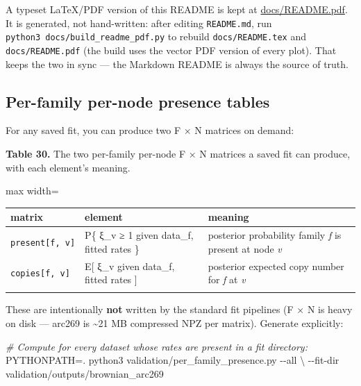 \documentclass[
  10pt,
]{article}
\newenvironment{Shaded}{}{}
\newcommand{\AttributeTok}[1]{\textcolor[rgb]{0.49,0.56,0.16}{#1}}
\newcommand{\CommentTok}[1]{\textcolor[rgb]{0.38,0.63,0.69}{\textit{#1}}}
\newcommand{\DataTypeTok}[1]{\textcolor[rgb]{0.56,0.13,0.00}{#1}}
\newcommand{\ExtensionTok}[1]{#1}
\newcommand{\NormalTok}[1]{#1}
\newcommand{\OperatorTok}[1]{\textcolor[rgb]{0.40,0.40,0.40}{#1}}
\newcommand{\VariableTok}[1]{\textcolor[rgb]{0.10,0.09,0.49}{#1}}
\begin{document}
A typeset LaTeX/PDF version of this README is kept at
\url{docs/README.pdf}. It is generated, not hand-written: after editing
\texttt{README.md}, run \texttt{python3\ docs/build\_readme\_pdf.py} to
rebuild \texttt{docs/README.tex} and \texttt{docs/README.pdf} (the build
uses the vector PDF version of every plot). That keeps the two in sync
--- the Markdown README is always the source of truth.

\subsection{Per-family per-node presence
tables}\label{per-family-per-node-presence-tables}

For any saved fit, you can produce two F × N matrices on demand:

\textbf{Table 30.} The two per-family per-node F × N matrices a saved
fit can produce, with each element's meaning.

\begin{center}
\begin{adjustbox}{max width=\textwidth}
\begin{tabular}{@{}lll@{}}
\toprule\noalign{}
matrix & element & meaning \\
\midrule\noalign{}
\texttt{present{[}f,\ v{]}} & P\{ ξ\_v ≥ 1 given data\_f, fitted rates
\} & posterior probability family \emph{f} is present at node
\emph{v} \\
\texttt{copies{[}f,\ v{]}} & E{[} ξ\_v given data\_f, fitted rates {]} &
posterior expected copy number for \emph{f} at \emph{v} \\
\bottomrule\noalign{}
\end{tabular}
\end{adjustbox}
\end{center}

These are intentionally \textbf{not} written by the standard fit
pipelines (F × N is heavy on disk --- arc269 is \textasciitilde21 MB
compressed NPZ per matrix). Generate explicitly:

\begin{Shaded}
\begin{Highlighting}[]
\CommentTok{\# Compute for every dataset whose rates are present in a fit directory:}
\VariableTok{PYTHONPATH}\OperatorTok{=}\NormalTok{. }\ExtensionTok{python3}\NormalTok{ validation/per\_family\_presence.py }\AttributeTok{{-}{-}all} \DataTypeTok{\textbackslash{}}
    \AttributeTok{{-}{-}fit{-}dir}\NormalTok{ validation/outputs/brownian\_arc269}
\end{Highlighting}
\end{Shaded}
\end{document}
